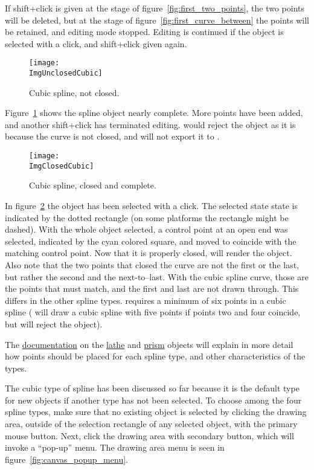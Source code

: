 		If shift+click is given at the stage of
		figure~\ref{fig:first_two_points}, the two points will
		be deleted, but at the stage of
		figure~\ref{fig:first_curve_between} the points will
		be retained, and editing mode stopped. Editing
		is continued if the object is selected with a click,
		and shift+click given again.

		\begin{figure}[htbp]
		\centering
		\texttt{[image: \\ImgUnclosedCubic]}
		\caption{Cubic spline, not closed.}
		\label{fig:first_cubic_unclosed}
		\end{figure}

		Figure~\ref{fig:first_cubic_unclosed} shows the spline
		object nearly complete. More points have been added,
		and another shift+click
		has terminated editing. \IXpov{} would reject the object
		as it is because the curve is not closed, and \IXpkg{}
		will not export it to .

		\begin{figure}[htbp]
		\centering
		\texttt{[image: \\ImgClosedCubic]}
		\caption{Cubic spline, closed and complete.}
		\label{fig:first_cubic_closed}
		\end{figure}
		
		In figure~\ref{fig:first_cubic_closed} the object has
		been selected with a click. The selected state state is
		indicated by the dotted rectangle (on some platforms the
		rectangle might be dashed). With the whole object
		selected, a control point at an open end was selected,
		indicated by the cyan colored square, and moved to coincide
		with the matching control point. Now that it
		is properly closed, \IXpov{} will render the object.
		Also note that the two points that closed the curve are
		not the first or the last, but rather the second and
		the next-to--last. With the cubic spline curve, those
		are the points that must match, and the first and last
		are not drawn through. This differs in the other
		spline types. \IXpov{} requires a minimum of six
		points in a cubic spline (\IXpkg{} will draw a cubic
		spline with five points if points two and four coincide,
		but \IXpov{} will reject the object).
		
		The
		\IXpov{} \href{\URLPOVdocs}{documentation}
		on the
		\href{\URLPOVdocsLathe}{lathe}
		and
		\href{\URLPOVdocsPrism}{prism}
		objects will explain in more detail how points
		should be placed for each spline type, and other
		characteristics of the types.
		
		The cubic type of spline has been discussed so far
		because it is the default type for new objects if another
		type has not been selected. To choose among the four spline
		types, make sure that no existing object is selected by
		clicking the drawing area, outside of the selection
		rectangle of any selected object, with the primary
		mouse button. Next, click the drawing area with secondary
		button, which will invoke a ``pop-up'' menu. The
		drawing area menu is seen in
		figure~\ref{fig:canvas_popup_menu}.

